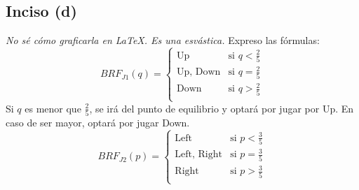 \documentclass{article}
\begin{document}
        \subsection*{Inciso (d)}
            \textit{No sé cómo graficarla en LaTeX. Es una esvástica.} Expreso las fórmulas:
            \[
                BRF_{J1}(q) =
                    \begin{cases} 
                        \text{Up} & \text{si } q < \frac{2}{5} \\ 
                        \text{Up, Down} & \text{si } q = \frac{2}{5} \\
                        \text{Down} & \text{si } q > \frac{2}{5} \\
                    \end{cases}
            \]
            Si $q$ es menor que $\frac{2}{5}$, se irá del punto de equilibrio y optará por jugar por Up. En caso de ser mayor, optará por jugar Down.
            \[
                BRF_{J2}(p) =
                    \begin{cases} 
                        \text{Left} & \text{si } p < \frac{3}{5} \\ 
                        \text{Left, Right} & \text{si } p = \frac{3}{5} \\
                        \text{Right} & \text{si } p > \frac{3}{5} \\
                    \end{cases}
            \]
\end{document}
